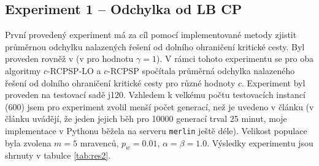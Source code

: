 \documentclass[a4paper,12pt]{article}
\begin{document}
\subsection{Experiment 1 -- Odchylka od LB CP}

První provedený experiment má za cíl pomocí implementované metody zjistit průměrnou odchylku nalazených řešení od
dolního ohraničení kritické cesty. Byl proveden rovněž 
v \cite{Merkle00antcolony, 1027745} (v \cite{1027745} pro hodnotu $\gamma = 1$). V rámci tohoto experimentu se pro oba algoritmy $c$-RCPSP-LO a $c$-RCPSP
spočítala průměrná odchylka nalazeného řešení od dolního ohraničení kritické cesty pro 
různé hodnoty $c$. Experiment byl proveden na testovací sadě j120. Vzhledem k velkému počtu testovacích 
instancí (600) jsem pro experiment zvolil menší počet generací, než je uvedeno v článku (v článku \cite{Merkle00antcolony} uvádějí,
že jeden jejich běh pro 10000 generací trval 25 minut, moje implementace v Pythonu běžela na serveru \texttt{merlin} ještě déle).
Velikost populace byla zvolena $m = 5$ mravenců, $p_w = 0.01$, $\alpha = \beta = 1.0$. Výsledky experimentu jsou shrnuty
v tabulce \ref{tab:res2}.
\end{document}
